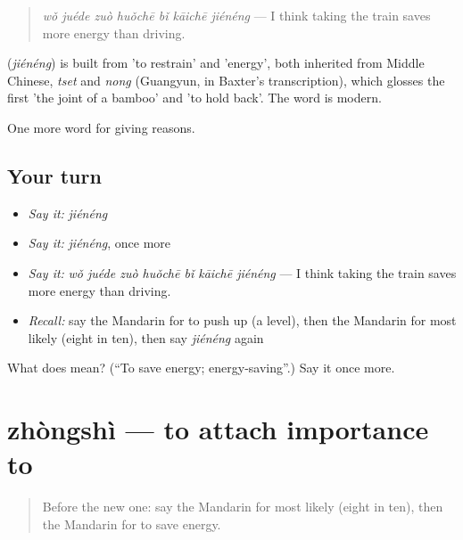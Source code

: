 \begin{quote}
\textbf{} \emph{wǒ juéde zuò huǒchē bǐ kāichē jiénéng} — I think taking the train saves more energy than driving.
\end{quote}

\begin{cousinweb}
\textbf{} (\emph{jiénéng}) is built from  'to restrain' and  'energy', both inherited from Middle Chinese, \emph{tset} and \emph{nong} (Guangyun, in Baxter's transcription), which glosses the first 'the joint of a bamboo' and 'to hold back'. The word is modern.
\end{cousinweb}

\begin{grammarlens}[title={What you've built}]
One more word for giving reasons.
\end{grammarlens}

\subsection*{Your turn}
\begin{itemize}
\raggedright
  \item \emph{Say it:} \emph{jiénéng}
  \item \emph{Say it:} \emph{jiénéng}, once more
  \item \emph{Say it:} \emph{wǒ juéde zuò huǒchē bǐ kāichē jiénéng} — I think taking the train saves more energy than driving.
  \item \emph{Recall:} say the Mandarin for to push up (a level), then the Mandarin for most likely (eight in ten), then say \emph{jiénéng} again
\end{itemize}

\begin{tcolorbox}[breakable,colback=teal!4,colframe=teal!35!black,title={Before you move on}]
What does  mean? (\textquotedblleft{}To save energy; energy-saving\textquotedblright{}.) Say it once more.
\end{tcolorbox}
\section[zhòngshì]{zhòngshì — to attach importance to}

\label{lesson:ZH-C385-zhongshi}



\begin{quote}
Before the new one: say the Mandarin for most likely (eight in ten), then the Mandarin for to save energy.
\end{quote}

